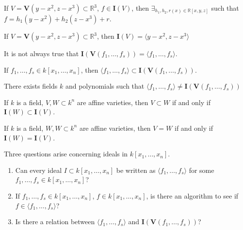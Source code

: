 \documentclass[crop=false,class=article,oneside]{standalone}
\begin{document}
            \begin{theorem}
                If $V=\mathbf{V}(y-x^2,z-x^3)\subset\mathbb{R}^3$,
                $f\in \mathbf{I}(V)$,
                then $\exists_{h_1,h_2,r(x)\in\mathbb{R}[x,y,z]}$
                such that $f=h_1(y-x^2)+h_2(z-x^3)+r$.
            \end{theorem}
            \begin{theorem}
                If $V=\mathbf{V}(y-x^2,z-x^3)\subset\mathbb{R}^3$,
                then $\mathbf{I}(V)=\langle y-x^2,z-x^3\rangle$
            \end{theorem}
            \begin{remark}
                It is not always true that
                $\mathbf{I}(\mathbf{V}(f_1,\hdots, f_s))%
                 =\langle f_1,\hdots, f_s\rangle$.
            \end{remark}
            \begin{theorem}
                If $f_1,\hdots, f_s \in k[x_1,\hdots ,x_n]$, then
                $\langle f_1,\hdots,f_s\rangle%
                 \subset\mathbf{I}(\mathbf{V}(f_1,\hdots, f_s))$.
            \end{theorem}
            \begin{theorem}
                There exists fields $k$ and polynomials
                such that
                $\langle f_1,\hdots,f_s\rangle%
                 \ne\mathbf{I}(\mathbf{V}(f_1,\hdots, f_s))$
            \end{theorem}
            \begin{theorem}
                If $k$ is a field, $V,W\subset k^n$ are affine
                varieties, then $V\subset W$ if and only if
                $\mathbf{I}(W)\subset \mathbf{I}(V)$.
            \end{theorem}
            \begin{theorem}
                If $k$ is a field, $W,W\subset k^n$ are
                affine varieties, then $V=W$ if
                and only if $\mathbf{I}(W)=\mathbf{I}(V)$.
            \end{theorem}
            Three questions arise concerning
            ideals in $k[x_1,\hdots ,x_n]$.
            \begin{enumerate}
                \item Can every ideal $I\subset k[x_1,\hdots ,x_n]$
                      be written as $\langle f_1,\hdots, f_s\rangle$
                      for some $f_1,\hdots, f_s \in k[x_1,\hdots ,x_n]$?
                \item If $f_1,\hdots, f_s\in k[x_1,\hdots ,x_n]$,
                      $f\in k[x_1,\hdots ,x_n]$, is there an
                      algorithm to see if $f\in\langle f_{1},\hdots,f_{s}\rangle$?
                \item Is there a relation between
                      $\langle f_1,\hdots, f_s\rangle$ and
                      $\mathbf{I}(\mathbf{V}(f_1,\hdots, f_s))$?
            \end{enumerate}
\end{document}
